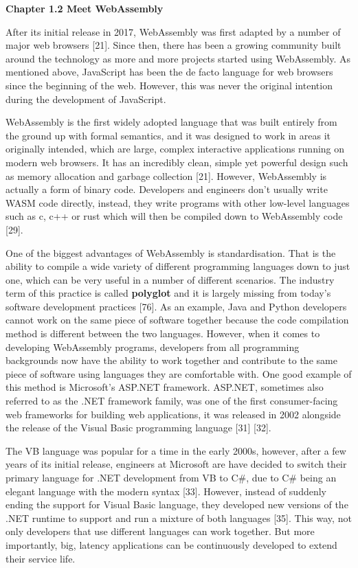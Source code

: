 \bigskip
\textbf{{\Large Chapter 1.2 Meet WebAssembly}}

After its initial release in 2017, WebAssembly was first adapted by a number of major web browsers [21]. Since then, there has been a growing community built around the technology as more and more projects started using WebAssembly. As mentioned above, JavaScript has been the de facto language for web browsers since the beginning of the web. However, this was never the original intention during the development of JavaScript.

WebAssembly is the first widely adopted language that was built entirely from the ground up with formal semantics, and it was designed to work in areas it originally intended, which are large, complex interactive applications running on modern web browsers. It has an incredibly clean, simple yet powerful design such as memory allocation and garbage collection [21]. However, WebAssembly is actually a form of binary code. Developers and engineers don't usually write WASM code directly, instead, they write programs with other low-level languages such as c, c++ or rust which will then be compiled down to WebAssembly code [29].

One of the biggest advantages of WebAssembly is standardisation. That is the ability to compile a wide variety of different programming languages down to just one, which can be very useful in a number of different scenarios. The industry term of this practice is called \textbf{polyglot} and it is largely missing from today's software development practices [76]. As an example, Java and Python developers cannot work on the same piece of software together because the code compilation method is different between the two languages. However, when it comes to developing WebAssembly programs, developers from all programming backgrounds now have the ability to work together and contribute to the same piece of software using languages they are comfortable with. One good example of this method is Microsoft's ASP.NET framework. ASP.NET, sometimes also referred to as the .NET framework family, was one of the first consumer-facing web frameworks for building web applications, it was released in 2002 alongside the release of the Visual Basic programming language [31] [32].

The VB language was popular for a time in the early 2000s, however, after a few years of its initial release, engineers at Microsoft are have decided to switch their primary language for .NET development from VB to C\#, due to C\# being an elegant language with the modern syntax [33]. However, instead of suddenly ending the support for Visual Basic language, they developed new versions of the .NET runtime to support and run a mixture of both languages [35]. This way, not only developers that use different languages can work together. But more importantly, big, latency applications can be continuously developed to extend their service life.

